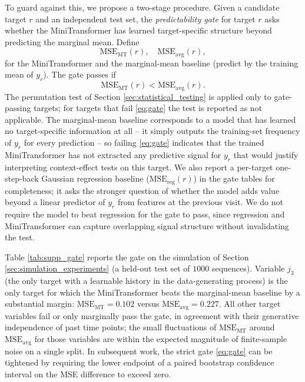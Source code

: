 \documentclass[AMA,Times1COL]{WileyNJDv5} %
\begin{document}
To guard against this, we propose a two-stage procedure. Given a candidate target $r$ and an independent test set, the \emph{predictability gate} for target $r$ asks whether the MiniTransformer has learned target-specific structure beyond predicting the marginal mean. Define
\begin{equation}
    \mathrm{MSE}_{\mathrm{MT}}(r), \quad
    \mathrm{MSE}_{\mathrm{avg}}(r),
\end{equation}
for the MiniTransformer and the marginal-mean baseline (predict by the training mean of $y_r$). The gate passes if
\begin{equation}\label{eq:gate}
    \mathrm{MSE}_{\mathrm{MT}}(r) < \mathrm{MSE}_{\mathrm{avg}}(r).
\end{equation}
The permutation test of Section \ref{sec:statistical_testing} is applied only to gate-passing targets; for targets that fail \eqref{eq:gate} the test is reported as not applicable. The marginal-mean baseline corresponds to a model that has learned no target-specific information at all -- it simply outputs the training-set frequency of $y_r$ for every prediction -- so failing \eqref{eq:gate} indicates that the trained MiniTransformer has not extracted any predictive signal for $y_r$ that would justify interpreting context-effect tests on this target. We also report a per-target one-step-back Gaussian regression baseline ($\mathrm{MSE}_{\mathrm{reg}}(r)$) in the gate tables for completeness; it asks the stronger question of whether the model adds value beyond a linear predictor of $y_r$ from features at the previous visit. We do not require the model to beat regression for the gate to pass, since regression and MiniTransformer can capture overlapping signal structure without invalidating the test.

Table \ref{tab:supp_gate} reports the gate on the simulation of Section \ref{sec:simulation_experiments} (a held-out test set of $1000$ sequences). Variable $j_3$ (the only target with a learnable history in the data-generating process) is the only target for which the MiniTransformer beats the marginal-mean baseline by a substantial margin: $\mathrm{MSE}_{\mathrm{MT}} = 0.102$ versus $\mathrm{MSE}_{\mathrm{avg}} = 0.227$. All other target variables fail or only marginally pass the gate, in agreement with their generative independence of past time points; the small fluctuations of $\mathrm{MSE}_{\mathrm{MT}}$ around $\mathrm{MSE}_{\mathrm{avg}}$ for those variables are within the expected magnitude of finite-sample noise on a single split. In subsequent work, the strict gate \eqref{eq:gate} can be tightened by requiring the lower endpoint of a paired bootstrap confidence interval on the MSE difference to exceed zero.
\end{document}
